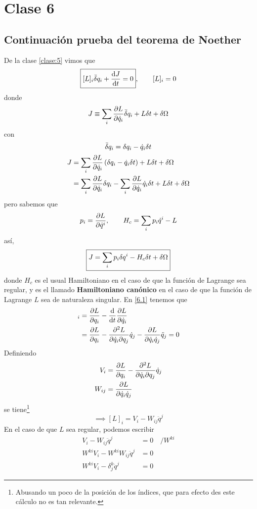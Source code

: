 \section{Clase 6}
\subsection{Continuación prueba del teorema de Noether}
De la clase \ref{clase:5} vimos que
\begin{equation}\label{6.1}
    \boxed{[L]_i\bar{\delta} q_i+\dv{J}{t}=0}, \qquad [L]_i=0
\end{equation}
donde 
\begin{equation}
  J\equiv \sum_i\pdv{L}{\dot{q}_i}\bar{\delta} q_i+L\delta t+\delta\Omega 
\end{equation}
con 
\begin{equation}
  \bar{\delta} q_i=\delta q_i-\dot{q}_i\delta t
\end{equation}
\begin{align}
  J&=\sum_i\pdv{L}{\qd_i}\l(\d q_i-\qd_i\d t\r)+L\d t+\d\Omega\\
  &=\sum_i\pdv{L}{\qd_i}\d q_i-\sum_i\pdv{L}{\qd_i}\qd_i\d t+L\d t+\d\Omega
\end{align}
pero sabemos que 
\begin{equation}
  p_i=\pdv{L}{\dot{q}^{i}},\qquad H_c=\sum_ip_i\dot{q}^{i}-L
\end{equation}
así,
\begin{equation}
\boxed{J=\sum_i p_i\delta q^{i}-H_c\delta t+\delta\Omega}
\end{equation}
donde $H_c$ es el usual Hamiltoniano en el caso de que la función de Lagrange sea regular, y es el llamado \textbf{Hamiltoniano canónico} en el caso de que la función de Lagrange $L$ sea de naturaleza singular.
En \eqref{6.1} tenemos que
\begin{align}
  [L]_i&=\EL\\
  &=\pdv{L}{q_i}-\pdv{L}{\qd_i}{q_j}\qd_j-\pdv{L}{\qd_i\qd_j}\ddot{q}_j=0
\end{align}
Definiendo
\begin{align}
  V_i&=\pdv{L}{q_i}-\pdv{L}{\dot{q}_i}{q_j}\dot{q}_j\\
  W_{ij}&=\pdv{L}{\dot{q}_i\dot{q}_j}
\end{align}
se tiene\footnote{Abusando un poco de la posición de los índices, que para efecto des este cálculo no es tan relevante.}
\begin{equation}
  \implies [L]_i=V_i-W_{ij}\ddot{q}^j
\end{equation}
En el caso de que $L$ sea regular, podemos escribir
\begin{align}
  V_i-W_{ij}\ddot{q}^{j}&=0 \quad/ W^{ki}\\
  W^{ki}V_i-W^{ki}W_{ij}\ddot{q}^j&=0\\
  W^{ki}V_i-\delta^k_j\ddot{q}^j&=0
\end{align}
